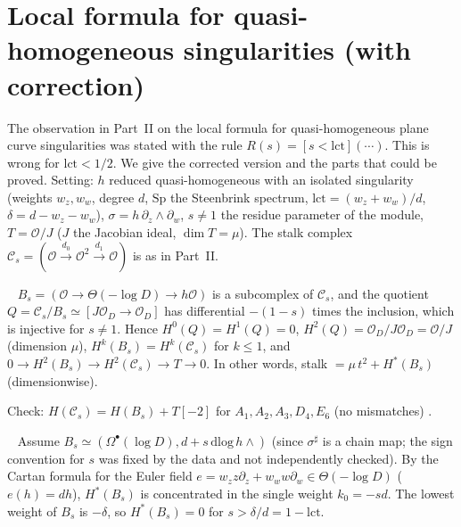 \section{Local formula for quasi-homogeneous singularities (with correction)}\label{p3:sec:local}
The observation in Part~II on the local formula for quasi-homogeneous plane curve singularities was stated with the rule $R(s)=[s<\mathrm{lct}](\cdots)$. This is wrong for $\mathrm{lct}<1/2$. We give the corrected version and the parts that could be proved. Setting: $h$ reduced quasi-homogeneous with an isolated singularity (weights $w_z,w_w$, degree $d$, $\mathrm{Sp}$ the Steenbrink spectrum, $\mathrm{lct}=(w_z+w_w)/d$, $\delta=d-w_z-w_w$), $\sigma=h\,\partial_z\wedge\partial_w$, $s\ne1$ the residue parameter of the module, $T=\mathcal O/J$ ($J$ the Jacobian ideal, $\dim T=\mu$). The stalk complex $\mathcal C_s=(\mathcal O\xrightarrow{d_0}\mathcal O^2\xrightarrow{d_1}\mathcal O)$ is as in Part~II.
\begin{prop}\tP\ \tV\label{p3:prop:Q}
$B_s=(\mathcal O\to\Theta(-\log D)\to h\mathcal O)$ is a subcomplex of $\mathcal C_s$, and the quotient $Q=\mathcal C_s/B_s\simeq[J\mathcal O_D\to\mathcal O_D]$ has differential $-(1-s)$ times the inclusion, which is injective for $s\ne1$. Hence $H^0(Q)=H^1(Q)=0$, $H^2(Q)=\mathcal O_D/J\mathcal O_D=\mathcal O/J$ (dimension $\mu$), $H^k(B_s)=H^k(\mathcal C_s)$ for $k\le1$, and $0\to H^2(B_s)\to H^2(\mathcal C_s)\to T\to0$. In other words, stalk $=\mu\,t^2+H^*(B_s)$ (dimensionwise).
\end{prop}
\noindent Check: $H(\mathcal C_s)=H(B_s)+T[-2]$ for $A_1,A_2,A_3,D_4,E_6$ (no mismatches) \tV.
\begin{prop}\tP\ \tQ\label{p3:prop:weight}
Assume $B_s\simeq(\Omega^\bullet(\log D),d+s\,\mathrm{dlog}\,h\wedge)$ (since $\sigma^\sharp$ is a chain map; the sign convention for $s$ was fixed by the data and not independently checked). By the Cartan formula for the Euler field $e=w_zz\partial_z+w_ww\partial_w\in\Theta(-\log D)$ ($e(h)=dh$), $H^*(B_s)$ is concentrated in the single weight $k_0=-sd$. The lowest weight of $B_s$ is $-\delta$, so $H^*(B_s)=0$ for $s>\delta/d=1-\mathrm{lct}$.
\end{prop}
